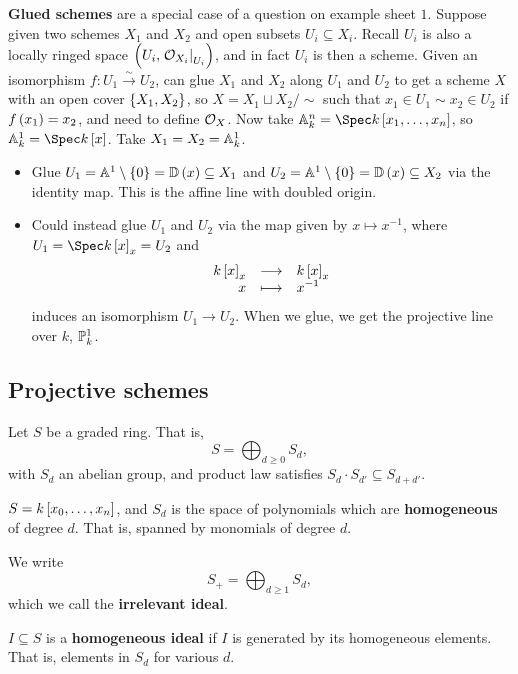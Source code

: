 \begin{example*}
\textbf{Glued schemes} are a special case of a question on example sheet $ 1 $. Suppose given two schemes $ X_1 $ and $ X_2 $ and open subsets $ U_i \subseteq X_i $. Recall $ U_i $ is also a locally ringed space $ \br{U_i, \eval{\OOO_{X_i}}_{U_i}} $, and in fact $ U_i $ is then a scheme. Given an isomorphism $ f : U_1 \xrightarrow{\sim} U_2 $, can glue $ X_1 $ and $ X_2 $ along $ U_1 $ and $ U_2 $ to get a scheme $ X $ with an open cover $ \cbr{X_1, X_2} $, so $ X = X_1 \sqcup X_2 / \sim $ such that $ x_1 \in U_1 \sim x_2 \in U_2 $ if $ f\br{x_1} = x_2 $, and need to define $ \OOO_X $. Now take $ \AA_k^n = \Spec k\sbr{x_1, \dots, x_n} $, so $ \AA_k^1 = \Spec k\sbr{x} $. Take $ X_1 = X_2 = \AA_k^1 $.
\begin{itemize}
\item Glue $ U_1 = \AA^1 \setminus \cbr{0} = \DD\br{x} \subseteq X_1 $ and $ U_2 = \AA^1 \setminus \cbr{0} = \DD\br{x} \subseteq X_2 $ via the identity map. This is the affine line with doubled origin.
\item Could instead glue $ U_1 $ and $ U_2 $ via the map given by $ x \mapsto x^{-1} $, where $ U_1 = \Spec k\sbr{x}_x = U_2 $ and
$$ \function{k\sbr{x}_x}{k\sbr{x}_x}{x}{x^{-1}} $$
induces an isomorphism $ U_1 \to U_2 $. When we glue, we get the projective line over $ k $, $ \PP_k^1 $.
\end{itemize}
\end{example*}

\subsection{Projective schemes}

Let $ S $ be a graded ring. That is,
$$ S = \bigoplus_{d \ge 0} S_d, $$
with $ S_d $ an abelian group, and product law satisfies $ S_d \cdot S_{d'} \subseteq S_{d + d'} $.

\begin{example*}
$ S = k\sbr{x_0, \dots, x_n} $, and $ S_d $ is the space of polynomials which are \textbf{homogeneous} of degree $ d $. That is, spanned by monomials of degree $ d $.
\end{example*}

We write
$$ S_+ = \bigoplus_{d \ge 1} S_d, $$
which we call the \textbf{irrelevant ideal}.

\begin{definition*}
$ I \subseteq S $ is a \textbf{homogeneous ideal} if $ I $ is generated by its homogeneous elements. That is, elements in $ S_d $ for various $ d $.
\end{definition*}

